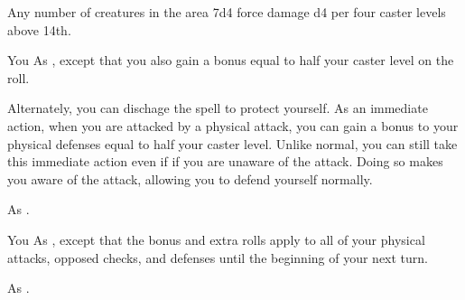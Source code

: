 \begin{spellheader}
\end{spellheader}
\begin{spelleffects}
    \begin{spelltargets}{Any number of creatures in the area}
        \spelleffect 7d4 force damage \add d4 per four caster levels above 14th.
    \end{spelltargets}
\end{spelleffects}

\begin{spellheader}
\end{spellheader}
\begin{spelleffects}
    \begin{spelltarget}{You}
        \spelleffect As , except that you also gain a bonus equal to half your caster level on the roll.

        Alternately, you can dischage the spell to protect yourself. As an immediate action, when you are attacked by a physical attack, you can gain a bonus to your physical defenses equal to half your caster level. Unlike normal, you can still take this immediate action even if if you are unaware of the attack. Doing so makes you aware of the attack, allowing you to defend yourself normally.
    \end{spelltarget}
\end{spelleffects}
\begin{spellfooter}
    \spellnotes As .
\end{spellfooter}

\begin{spellheader}
\end{spellheader}
\begin{spelleffects}
    \begin{spelltarget}{You}
        \spelleffect As , except that the bonus and extra rolls apply to all of your physical attacks, opposed checks, and defenses until the beginning of your next turn.
    \end{spelltarget}
\end{spelleffects}
\begin{spellfooter}
    \spellnotes As .
\end{spellfooter}

